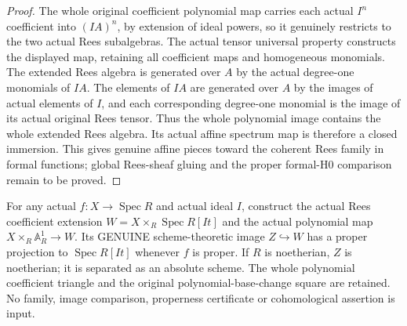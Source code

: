 \begin{proof}
The whole original coefficient polynomial map carries each actual $I^n$ coefficient into
$(IA)^n$, by extension of ideal powers, so it genuinely restricts to the two actual Rees
subalgebras. The actual tensor universal property constructs the displayed map, retaining
all coefficient maps and homogeneous monomials. The extended Rees algebra is generated over
$A$ by the actual degree-one monomials of $IA$. The elements of $IA$ are generated over $A$
by the images of actual elements of $I$, and each corresponding degree-one monomial is the
image of its actual original Rees tensor. Thus the whole polynomial image contains the whole
extended Rees algebra. Its actual affine spectrum map is therefore a closed immersion.
This gives genuine affine pieces toward the coherent Rees family in formal functions; global
Rees-sheaf gluing and the proper formal-H0 comparison remain to be proved.
\end{proof}

\begin{lemma}\label{lem:fc-rees-formal-family}
\leanok
{}
For any actual $f\colon X\to\operatorname{Spec}R$ and actual ideal $I$, construct the actual
Rees coefficient extension $W=X\times_R\operatorname{Spec}R[It]$ and the actual polynomial
map $X\times_R\mathbb A^1_R\to W$. Its GENUINE scheme-theoretic image $Z\hookrightarrow W$
has a proper projection to $\operatorname{Spec}R[It]$ whenever $f$ is proper. If $R$ is
noetherian, $Z$ is noetherian; it is separated as an absolute scheme. The whole polynomial
coefficient triangle and the original polynomial-base-change square are retained.
No family, image comparison, properness certificate or cohomological assertion is input.
\end{lemma}

